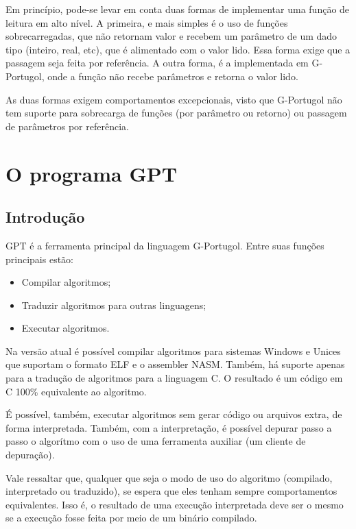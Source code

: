 \documentclass[a4paper,11pt]{report}
\begin{document}
Em princípio, pode-se levar em conta duas formas de implementar uma função de
leitura em alto nível. A primeira, e mais simples é o uso de funções
sobrecarregadas, que não retornam valor e recebem um parâmetro de um dado tipo
(inteiro, real, etc), que é alimentado com o valor lido. Essa forma exige que a
passagem seja feita por referência. A outra forma, é a implementada em
G-Portugol, onde a função não recebe parâmetros e retorna o valor lido.

As duas formas exigem comportamentos excepcionais, visto que G-Portugol não tem
suporte para sobrecarga de funções (por parâmetro ou retorno) ou passagem de
parâmetros por referência.


\chapter{O programa GPT}

\section{Introdução}

GPT é a ferramenta principal da linguagem G-Portugol. Entre suas funções
principais estão:

\begin{itemize}
  \item Compilar algoritmos;
  \item Traduzir algoritmos para outras linguagens;
  \item Executar algoritmos.
\end{itemize}

Na versão atual é possível compilar algoritmos para sistemas Windows e Unices
que suportam o formato ELF e o assembler NASM. Também, há suporte apenas para a
tradução de algoritmos para a linguagem C. O resultado é um código em C 100\%
equivalente ao algoritmo.

É possível, também, executar algoritmos sem gerar código ou arquivos extra, de
forma interpretada. Também, com a interpretação, é possível depurar passo a
passo o algorítmo com o uso de uma ferramenta auxiliar (um cliente de
depuração).

Vale ressaltar que, qualquer que seja o modo de uso do algoritmo (compilado,
interpretado ou traduzido), se espera que eles tenham sempre comportamentos
equivalentes. Isso é, o resultado de uma execução interpretada deve ser o mesmo
se a execução fosse feita por meio de um binário compilado.
\end{document}
